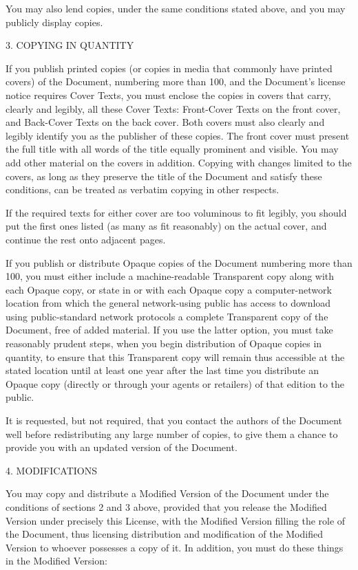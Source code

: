 \begin{noIndex}
You may also lend copies, under the same conditions stated above, and
you may publicly display copies.


3. COPYING IN QUANTITY 

If you publish printed copies (or copies in media that commonly have
printed covers) of the Document, numbering more than 100, and the
Document's license notice requires Cover Texts, you must enclose the
copies in covers that carry, clearly and legibly, all these Cover
Texts: Front-Cover Texts on the front cover, and Back-Cover Texts on
the back cover. Both covers must also clearly and legibly identify you
as the publisher of these copies. The front cover must present the
full title with all words of the title equally prominent and
visible. You may add other material on the covers in addition. Copying
with changes limited to the covers, as long as they preserve the title
of the Document and satisfy these conditions, can be treated as
verbatim copying in other respects.

If the required texts for either cover are too voluminous to fit
legibly, you should put the first ones listed (as many as fit
reasonably) on the actual cover, and continue the rest onto adjacent
pages.

If you publish or distribute Opaque copies of the Document numbering
more than 100, you must either include a machine-readable Transparent
copy along with each Opaque copy, or state in or with each Opaque copy
a computer-network location from which the general network-using
public has access to download using public-standard network protocols
a complete Transparent copy of the Document, free of added
material. If you use the latter option, you must take reasonably
prudent steps, when you begin distribution of Opaque copies in
quantity, to ensure that this Transparent copy will remain thus
accessible at the stated location until at least one year after the
last time you distribute an Opaque copy (directly or through your
agents or retailers) of that edition to the public.

It is requested, but not required, that you contact the authors of the
Document well before redistributing any large number of copies, to
give them a chance to provide you with an updated version of the
Document.


4. MODIFICATIONS 

You may copy and distribute a Modified Version of the Document under
the conditions of sections 2 and 3 above, provided that you release
the Modified Version under precisely this License, with the Modified
Version filling the role of the Document, thus licensing distribution
and modification of the Modified Version to whoever possesses a copy
of it. In addition, you must do these things in the Modified Version:


\end{noIndex}
